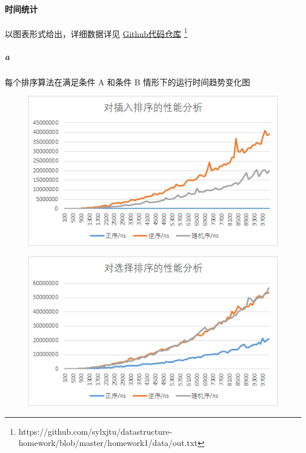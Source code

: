 \documentclass[UTF8]{ctexart}
\begin{document}
    \paragraph{时间统计} 以图表形式给出，详细数据详见
      \href{https://github.com/sylxjtu/datastructure-homework/blob/master/homework1/data/out.txt}{Github代码仓库}
      \footnote{https://github.com/sylxjtu/datastructure-homework/blob/master/homework1/data/out.txt}
      \subparagraph{a} 每个排序算法在满足条件 A 和条件 B 情形下的运行时间趋势变化图
        \begin{figure}[H]
          \includegraphics[width=\textwidth]{insertionsort}
          \centering
        \end{figure}
        \begin{figure}[H]
          \includegraphics[width=\textwidth]{selectionsort}
          \centering
        \end{figure}
\end{document}
